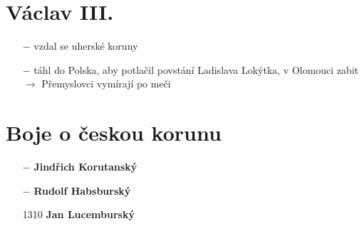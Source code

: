 \documentclass{article}
\begin{document}
\section*{Václav III.}
\begin{itemize}
    \vspace{-0.5em}
    \setlength\itemsep{0.15em}
    \item[$-$] vzdal se uherské koruny
    \item[$-$] táhl do Polska, aby potlačil povstání Ladislava Lokýtka, v Olomouci zabit $\rightarrow$ Přemyslovci vymírají po meči
\end{itemize}

\section*{Boje o českou korunu}
\begin{itemize}
    \vspace{-0.5em}
    \setlength\itemsep{0.15em}
    \item[$-$] \textbf{Jindřich Korutanský}
    \item[$-$] \textbf{Rudolf Habsburský}
    \item[1310] \textbf{Jan Lucemburský}
\end{itemize}
\end{document}
